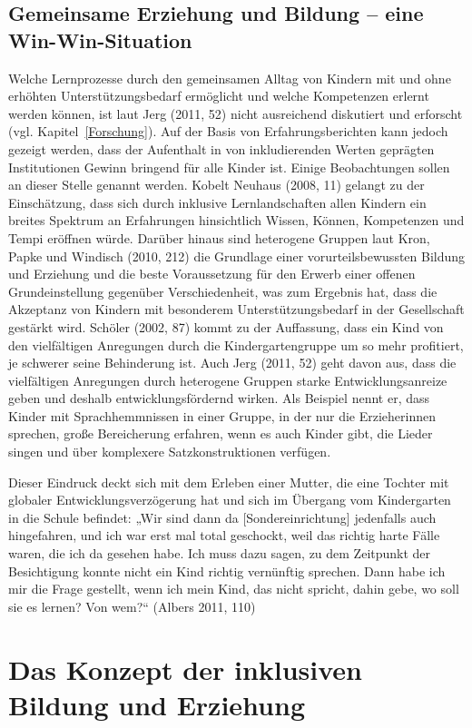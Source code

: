 \subsection{Gemeinsame Erziehung und Bildung -- eine Win-Win-Situation}
Welche Lernprozesse durch den gemeinsamen Alltag von Kindern mit und ohne erhöhten Unterstützungsbedarf ermöglicht und welche Kompetenzen erlernt werden können, ist laut Jerg (2011, 52) nicht ausreichend diskutiert und erforscht (vgl. Kapitel~\ref{Forschung}).
Auf der Basis von Erfahrungsberichten kann jedoch gezeigt werden, dass der Aufenthalt in von inkludierenden Werten geprägten Institutionen Gewinn bringend für alle Kinder ist. Einige Beobachtungen sollen an dieser Stelle genannt werden. 
Kobelt Neuhaus (2008, 11) gelangt zu der Einschätzung, dass sich durch inklusive Lernlandschaften allen Kindern ein breites Spektrum an Erfahrungen hinsichtlich Wissen, Können, Kompetenzen und Tempi eröffnen würde. 
Darüber hinaus sind heterogene Gruppen laut Kron, Papke und Windisch (2010, 212) die Grundlage einer vorurteilsbewussten Bildung und Erziehung und die beste Voraussetzung für den Erwerb einer offenen Grundeinstellung gegenüber Verschiedenheit, was zum Ergebnis hat, dass die Akzeptanz von Kindern mit besonderem Unterstützungsbedarf in der Gesellschaft gestärkt wird.  
Schöler (2002, 87) kommt zu der Auffassung, dass ein Kind von den vielfältigen Anregungen durch die Kindergartengruppe um so mehr profitiert, je schwerer seine Behinderung ist. 
Auch Jerg (2011, 52) geht davon aus, dass die vielfältigen Anregungen durch heterogene Gruppen starke Entwicklungsanreize geben und deshalb entwicklungsfördernd wirken. Als Beispiel nennt er, dass Kinder mit Sprachhemmnissen in einer Gruppe, in der nur die Erzieherinnen sprechen, große Bereicherung erfahren, wenn es auch Kinder gibt, die Lieder singen und über komplexere Satzkonstruktionen verfügen.

Dieser Eindruck deckt sich mit dem Erleben einer Mutter, die eine Tochter mit globaler Entwicklungsverzögerung hat und sich im Übergang vom Kindergarten in die Schule befindet: 
„Wir sind dann da [Sondereinrichtung] jedenfalls auch hingefahren, und ich war erst mal total geschockt, weil das richtig harte Fälle waren, die ich da gesehen habe. Ich muss dazu sagen, zu dem Zeitpunkt der Besichtigung konnte nicht ein Kind richtig vernünftig sprechen. Dann habe ich mir die Frage gestellt, wenn ich mein Kind, das nicht spricht, dahin gebe, wo soll sie es lernen? Von wem?“ (Albers 2011, 110)

\section{Das Konzept der inklusiven Bildung und Erziehung}\label{sec:Inklusionsverstandnis}

